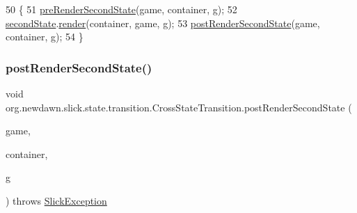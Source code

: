 \begin{DoxyCode}
50                                                                                                            
      \{
51         \mbox{\hyperlink{classorg_1_1newdawn_1_1slick_1_1state_1_1transition_1_1_cross_state_transition_a87a8c85266ef00b34bbe8888c358aab0}{preRenderSecondState}}(game, container, g);
52         \mbox{\hyperlink{classorg_1_1newdawn_1_1slick_1_1state_1_1transition_1_1_cross_state_transition_a75dc8f5366c67cb40b833672578fd7e5}{secondState}}.\mbox{\hyperlink{interfaceorg_1_1newdawn_1_1slick_1_1state_1_1_game_state_a065352d2725274c5244cd022f226eb17}{render}}(container, game, g);
53         \mbox{\hyperlink{classorg_1_1newdawn_1_1slick_1_1state_1_1transition_1_1_cross_state_transition_a8b0b46e75abd29cf46e844de048b6227}{postRenderSecondState}}(game, container, g);
54     \}
\end{DoxyCode}
\mbox{\label{classorg_1_1newdawn_1_1slick_1_1state_1_1transition_1_1_cross_state_transition_a8b0b46e75abd29cf46e844de048b6227}} 
\subsubsection{\texorpdfstring{post\+Render\+Second\+State()}{postRenderSecondState()}}
{\footnotesize\ttfamily void org.\+newdawn.\+slick.\+state.\+transition.\+Cross\+State\+Transition.\+post\+Render\+Second\+State (\begin{DoxyParamCaption}\item[{\mbox{\hyperlink{classorg_1_1newdawn_1_1slick_1_1state_1_1_state_based_game}{State\+Based\+Game}}}]{game,  }\item[{\mbox{\hyperlink{classorg_1_1newdawn_1_1slick_1_1_game_container}{Game\+Container}}}]{container,  }\item[{\mbox{\hyperlink{classorg_1_1newdawn_1_1slick_1_1_graphics}{Graphics}}}]{g }\end{DoxyParamCaption}) throws \mbox{\hyperlink{classorg_1_1newdawn_1_1slick_1_1_slick_exception}{Slick\+Exception}}\hspace{0.3cm}{\ttfamily [inline]}}

